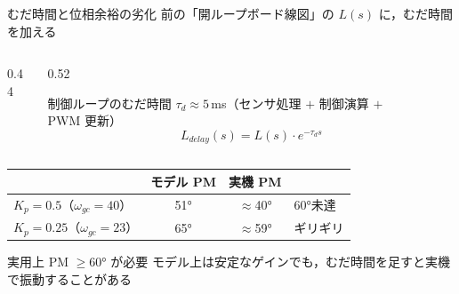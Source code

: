 \begin{frame}{むだ時間と位相余裕の劣化\later}
  {\footnotesize 前の「開ループボード線図」の $L(s)$ に，むだ時間を加える}
  \begin{columns}[c]
    \begin{column}{0.44\textwidth}
      \centering
    \end{column}
    \begin{column}{0.52\textwidth}
      \begin{block}{制御ループのむだ時間}\footnotesize
        \setlength{\abovedisplayskip}{2pt}\setlength{\belowdisplayskip}{2pt}%
        $\tau_d \approx 5$\,ms（センサ処理 $+$ 制御演算 $+$ PWM 更新）
        \[
          L_{delay}(s) = L(s)\cdot e^{-\tau_d s}
        \]
      \end{block}
    \end{column}
  \end{columns}

  \begin{center}\footnotesize
    \begin{tabular}{lccl}
      \hline
      & \textbf{モデル PM} & \textbf{実機 PM} & \\
      \hline
      $K_p=0.5$（$\omega_{gc}=40$）  & 51° & $\approx$40° & {\color{sfred}60°未達} \\
      $K_p=0.25$（$\omega_{gc}=23$） & 65° & $\approx$59° & ギリギリ \\
      \hline
    \end{tabular}
  \end{center}

  \begin{alertblock}{実用上 PM $\geq 60°$ が必要}\footnotesize
    モデル上は安定なゲインでも，むだ時間を足すと実機で振動することがある
  \end{alertblock}
\end{frame}



